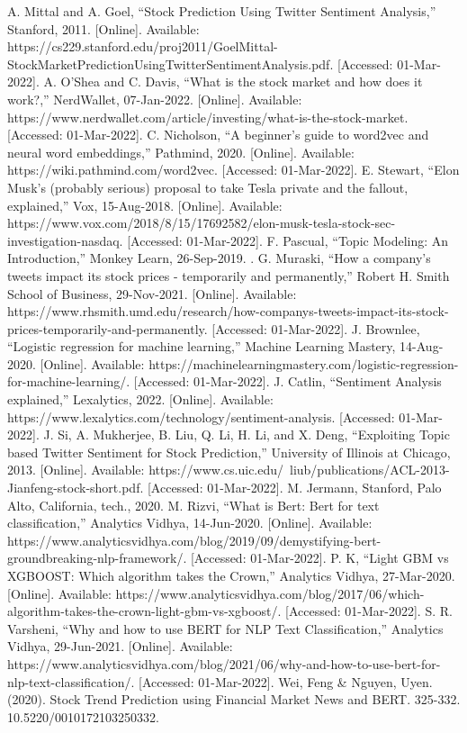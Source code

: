 \documentclass[conference]{IEEEtran}
\begin{document}
\begin{thebibliography}{00}
     A. Mittal and A. Goel, “Stock Prediction Using Twitter Sentiment Analysis,” Stanford, 2011. [Online]. Available: https://cs229.stanford.edu/proj2011/GoelMittal-StockMarketPredictionUsingTwitterSentimentAnalysis.pdf. [Accessed: 01-Mar-2022].
     A. O'Shea and C. Davis, “What is the stock market and how does it work?,” NerdWallet, 07-Jan-2022. [Online]. Available: https://www.nerdwallet.com/article/investing/what-is-the-stock-market. [Accessed: 01-Mar-2022].
     C. Nicholson, “A beginner's guide to word2vec and neural word embeddings,” Pathmind, 2020. [Online]. Available: https://wiki.pathmind.com/word2vec. [Accessed: 01-Mar-2022].
     E. Stewart, “Elon Musk's (probably serious) proposal to take Tesla private and the fallout, explained,” Vox, 15-Aug-2018. [Online]. Available: https://www.vox.com/2018/8/15/17692582/elon-musk-tesla-stock-sec-investigation-nasdaq. [Accessed: 01-Mar-2022].
     F. Pascual, “Topic Modeling: An Introduction,” Monkey Learn, 26-Sep-2019. .
     G. Muraski, “How a company's tweets impact its stock prices - temporarily and permanently,” Robert H. Smith School of Business, 29-Nov-2021. [Online]. Available: https://www.rhsmith.umd.edu/research/how-companys-tweets-impact-its-stock-prices-temporarily-and-permanently. [Accessed: 01-Mar-2022].
     J. Brownlee, “Logistic regression for machine learning,” Machine Learning Mastery, 14-Aug-2020. [Online]. Available: https://machinelearningmastery.com/logistic-regression-for-machine-learning/. [Accessed: 01-Mar-2022].
     J. Catlin, “Sentiment Analysis explained,” Lexalytics, 2022. [Online]. Available: https://www.lexalytics.com/technology/sentiment-analysis. [Accessed: 01-Mar-2022].
     J. Si, A. Mukherjee, B. Liu, Q. Li, H. Li, and X. Deng, “Exploiting Topic based Twitter Sentiment for Stock Prediction,” University of Illinois at Chicago, 2013. [Online]. Available: https://www.cs.uic.edu/~liub/publications/ACL-2013-Jianfeng-stock-short.pdf. [Accessed: 01-Mar-2022].
     M. Jermann, Stanford, Palo Alto, California, tech., 2020.
     M. Rizvi, “What is Bert: Bert for text classification,” Analytics Vidhya, 14-Jun-2020. [Online]. Available: https://www.analyticsvidhya.com/blog/2019/09/demystifying-bert-groundbreaking-nlp-framework/. [Accessed: 01-Mar-2022].
     P. K, “Light GBM vs XGBOOST: Which algorithm takes the Crown,” Analytics Vidhya, 27-Mar-2020. [Online]. Available: https://www.analyticsvidhya.com/blog/2017/06/which-algorithm-takes-the-crown-light-gbm-vs-xgboost/. [Accessed: 01-Mar-2022].
     S. R. Varsheni, “Why and how to use BERT for NLP Text Classification,” Analytics Vidhya, 29-Jun-2021. [Online]. Available: https://www.analyticsvidhya.com/blog/2021/06/why-and-how-to-use-bert-for-nlp-text-classification/. [Accessed: 01-Mar-2022].
     Wei, Feng & Nguyen, Uyen. (2020). Stock Trend Prediction using Financial Market News and BERT. 325-332. 10.5220/0010172103250332.
\end{thebibliography}
\end{document}
